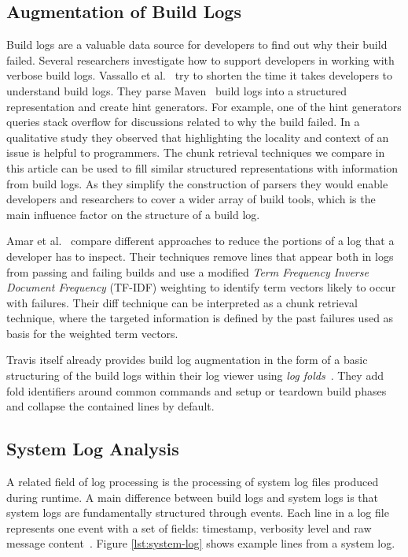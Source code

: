 \subsection{Augmentation of Build Logs}
\label{sec:rw-bl-analysis}
Build logs are a valuable data source for developers to find out why
their build failed.
Several researchers investigate how to support
developers in working with verbose build logs.
Vassallo et
al.~\cite{vassallo2018un-break} try to shorten the time it takes
developers to understand build logs.
They parse
Maven~\cite{maven2019website} build logs into a structured
representation and create hint generators.
For example, one of the hint generators queries stack overflow for
discussions related to why the build failed.
In a qualitative study
they observed that highlighting the locality and context of an issue
is helpful to programmers.
The chunk retrieval techniques we compare in this article can be used
to fill similar structured representations with information from build
logs.
As they simplify the construction of parsers they would enable
developers and researchers to cover a wider array of build tools,
which is the main influence factor on the structure of a build log.

Amar et al.~\cite{amar2019mining} compare different approaches to
reduce the portions of a log that a developer has to inspect.
Their
techniques remove lines that appear both in logs from passing and
failing builds and use a modified \emph{Term Frequency Inverse
Document Frequency} (TF-IDF) weighting to identify term vectors likely
to occur with failures.
Their diff technique can be interpreted as a
chunk retrieval technique, where the targeted information is defined
by the past failures used as basis for the weighted term vectors.

Travis itself already provides build log augmentation in the form of a
basic structuring of the build logs within their log viewer using
\emph{log folds}~\cite{travis2019logfolds}.
They add fold identifiers
around common commands and setup or teardown build phases and collapse
the contained lines by default.

\subsection{System Log Analysis}
\label{sec:log-analysis}
A related field of log processing is the processing of system log
files produced during runtime.
A main difference between build logs
and system logs is that system logs are fundamentally structured
through events.
Each line in a log file represents one event with a
set of fields: timestamp, verbosity level and raw message
content~\cite{he2017towards}.
Figure \ref{lst:system-log} shows
example lines from a system log.

